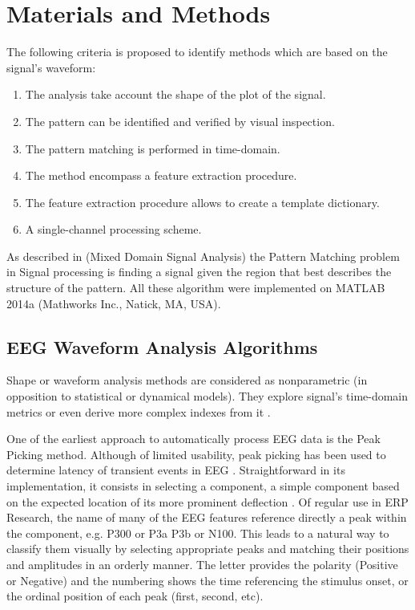 \documentclass[sensors,article,submit,moreauthors,pdftex,10pt,a4paper]{mdpi}
\begin{document}


\section{Materials and Methods}

The following criteria is proposed to identify methods which are based on the signal's waveform:

\begin{enumerate}
\item The analysis take account the shape of the plot of the signal.
\item The pattern can be identified and verified by visual inspection.
\item The pattern matching is performed in time-domain.
\item The method encompass a feature extraction procedure.
\item The feature extraction procedure allows to create a template dictionary.
\item A single-channel processing scheme.
\end{enumerate}

As described in (Mixed Domain Signal Analysis) the Pattern Matching problem in Signal processing is finding a signal given the region that best describes the structure of the pattern.   All these algorithm were implemented on MATLAB 2014a (Mathworks Inc., Natick, MA, USA). 

\subsection{EEG Waveform Analysis Algorithms}

Shape or waveform analysis methods are considered as nonparametric (in opposition to statistical or dynamical models).  They explore signal's time-domain metrics or even derive more complex indexes from it \citep{Thakor2009}. 

One of the earliest approach to automatically process EEG data is the Peak Picking method.  Although of limited usability, peak picking has been used to determine latency of transient events in EEG \citep{Jaskowski2000,Zhang2011}.  Straightforward in its implementation, it consists in selecting a component, a simple component based on the expected location of its more prominent deflection \citep{Ouyang2017}.  Of regular use in ERP Research, the name of many of the EEG features reference directly a peak within the component, e.g. P300 or P3a P3b or N100.  This leads to a natural way to classify them visually by selecting appropriate peaks and matching their positions and amplitudes in an orderly manner.  The letter provides the polarity (Positive or Negative) and the numbering shows the time referencing the stimulus onset, or the ordinal position of each peak (first, second, etc).   
\end{document}
